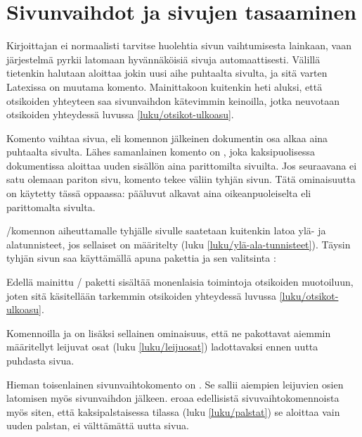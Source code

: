 \section{Sivunvaihdot ja sivujen tasaaminen}
\label{luku/sivunvaihdot}

Kirjoittajan ei normaalisti tarvitse huolehtia sivun vaihtumisesta
lainkaan, vaan järjestelmä pyrkii latomaan hyvännäköisiä sivuja
automaattisesti. Välillä tietenkin halutaan aloittaa jokin uusi aihe
puhtaalta sivulta, ja sitä varten Latexissa on muutama komento.
Mainittakoon kuitenkin heti aluksi, että otsikoiden yhteyteen saa
sivunvaihdon kätevimmin keinoilla, jotka neuvotaan otsikoiden yhteydessä
luvussa \ref{luku/otsikot-ulkoasu}.

Komento  vaihtaa sivua, eli komennon jälkeinen
dokumentin osa alkaa aina puhtaalta sivulta. Lähes samanlainen komento
on , joka kaksipuolisessa dokumentissa
aloittaa uuden sisällön aina parittomilta sivuilta. Jos seuraavana ei
satu olemaan pariton sivu, komento tekee väliin tyhjän sivun. Tätä
ominaisuutta on käytetty tässä oppaassa: pääluvut alkavat aina
oikeanpuoleiselta eli parittomalta sivulta.

\-/komennon aiheuttamalle tyhjälle sivulle
saatetaan kuitenkin latoa ylä- ja alatunnisteet, jos sellaiset on
määritelty (luku \ref{luku/ylä-ala-tunnisteet}). Täysin tyhjän sivun saa
käyttämällä apuna pakettia  ja sen valitsinta
:

\begin{koodilohkosis}
\usepackage[clearempty]{titlesec}
\end{koodilohkosis}

\noindent
Edellä mainittu \-/ paketti sisältää monenlaisia
toimintoja otsikoiden muotoiluun, joten sitä käsitellään tarkemmin
otsikoiden yhteydessä luvussa \ref{luku/otsikot-ulkoasu}.

Komennoilla  ja  on lisäksi
sellainen ominaisuus, että ne pakottavat aiemmin määritellyt leijuvat
osat (luku \ref{luku/leijuosat}) ladottavaksi ennen uutta puhdasta
sivua.

Hieman toisenlainen sivunvaihtokomento on . Se sallii
aiempien leijuvien osien latomisen myös sivunvaihdon jälkeen.
 eroaa edellisistä sivuvaihtokomennoista myös siten,
että kaksipalstaisessa tilassa (luku \ref{luku/palstat}) se aloittaa
vain uuden palstan, ei välttämättä uutta sivua.

